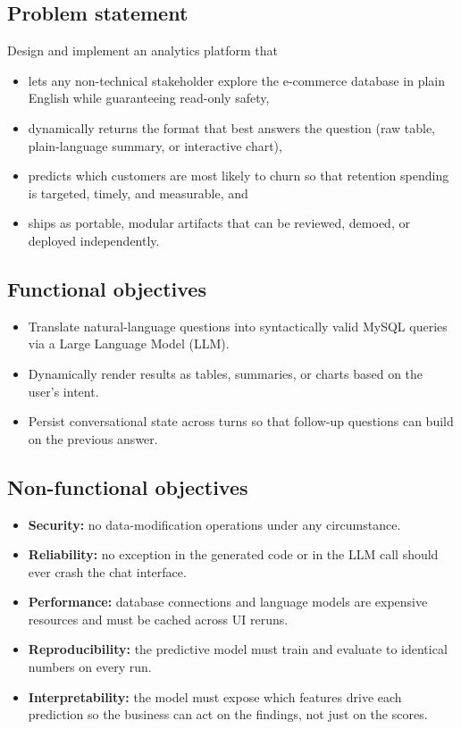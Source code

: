 \documentclass[11pt,a4paper]{article}
\begin{document}
\subsection*{Problem statement}
Design and implement an analytics platform that
\begin{itemize}
  \item lets any non-technical stakeholder explore the e-commerce
        database in plain English while guaranteeing read-only safety,
  \item dynamically returns the format that best answers the question
        (raw table, plain-language summary, or interactive chart),
  \item predicts which customers are most likely to churn so that
        retention spending is targeted, timely, and measurable, and
  \item ships as portable, modular artifacts that can be reviewed,
        demoed, or deployed independently.
\end{itemize}

\subsection*{Functional objectives}
\begin{itemize}
  \item Translate natural-language questions into syntactically valid
        MySQL queries via a Large Language Model (LLM).
  \item Dynamically render results as tables, summaries, or charts
        based on the user's intent.
  \item Persist conversational state across turns so that follow-up
        questions can build on the previous answer.
\end{itemize}

\subsection*{Non-functional objectives}
\begin{itemize}
  \item \textbf{Security:} no data-modification operations under any
        circumstance.
  \item \textbf{Reliability:} no exception in the generated code or in
        the LLM call should ever crash the chat interface.
  \item \textbf{Performance:} database connections and language models
        are expensive resources and must be cached across UI reruns.
  \item \textbf{Reproducibility:} the predictive model must train and
        evaluate to identical numbers on every run.
  \item \textbf{Interpretability:} the model must expose which features
        drive each prediction so the business can act on the findings,
        not just on the scores.
\end{itemize}
\end{document}
